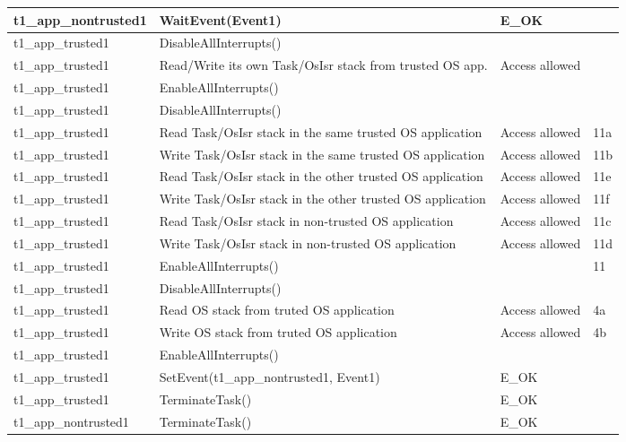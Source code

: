 \documentclass[10pt]{article}
\newlength{\Li}\settowidth{\Li}{Running}
\newlength{\Lii}\setlength{\Lii}{7cm}
\newlength{\Liiii}\setlength{\Liiii}{0.9cm}
\newlength{\Liii}\setlength{\Liii}{\textwidth} \addtolength{\Liii}{-\Li} \addtolength{\Liii}{-\Lii} \addtolength{\Liii}{-\Liiii}
\begin{document}
\begin{supertabular}{|p{\Li}|p{\Lii}|p{\Liii}|p{\Liiii}|}
	t1\_app\_nontrusted1	& WaitEvent(Event1)									& E\_OK											& \\ \hline
	
	t1\_app\_trusted1	& DisableAllInterrupts()								&												& \\ \hline
	t1\_app\_trusted1	& Read/Write its own Task/OsIsr stack from trusted OS app.	& Access allowed									& \\ \hline
	t1\_app\_trusted1	& EnableAllInterrupts()								&												& \\ \hline
	
	t1\_app\_trusted1	& DisableAllInterrupts()								&												& \\ \hline
	t1\_app\_trusted1	& Read Task/OsIsr stack in the same trusted OS application 	& Access allowed									& 11a \\ \hline
	t1\_app\_trusted1	& Write Task/OsIsr stack in the same trusted OS application 	& Access allowed									& 11b \\ \hline
	t1\_app\_trusted1	& Read Task/OsIsr stack in the other trusted OS application 	& Access allowed									& 11e \\ \hline
	t1\_app\_trusted1	& Write Task/OsIsr stack in the other trusted OS application 	& Access allowed									& 11f \\ \hline
	t1\_app\_trusted1	& Read Task/OsIsr stack in non-trusted OS application	 	& Access allowed									& 11c \\ \hline
	t1\_app\_trusted1	& Write Task/OsIsr stack in non-trusted OS application	 	& Access allowed									& 11d \\ \hline
	t1\_app\_trusted1	& EnableAllInterrupts()								&												& 11 \\ \hline

	t1\_app\_trusted1	& DisableAllInterrupts()								&												& \\ \hline
	t1\_app\_trusted1	& Read OS stack from truted OS application				& Access allowed									& 4a \\ \hline
	t1\_app\_trusted1	& Write OS stack from truted OS application				& Access allowed									& 4b \\ \hline
	t1\_app\_trusted1	& EnableAllInterrupts()								&												& \\ \hline

	t1\_app\_trusted1		& SetEvent(t1\_app\_nontrusted1, Event1)				& E\_OK											& \\ \hline
	t1\_app\_trusted1		& TerminateTask()									& E\_OK											& \\ \hline
	t1\_app\_nontrusted1	& TerminateTask()									& E\_OK											& \\ \hline
	\end{supertabular}\\
\end{document}
